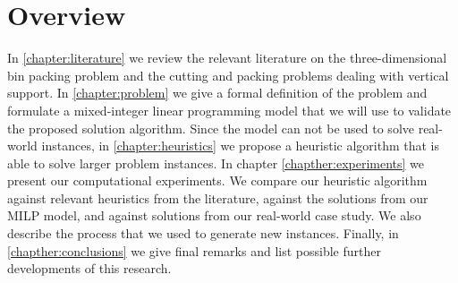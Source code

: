 \section{Overview}
\label{sec:intro:overview}%
In \cref{chapter:literature} we review the relevant literature on the three-dimensional bin packing problem and the cutting and packing problems dealing with vertical support.
In \cref{chapter:problem} we give a formal definition of the problem and formulate a mixed-integer linear programming model that we will use to validate the proposed solution algorithm.
Since the model can not be used to solve real-world instances, in \cref{chapter:heuristics} we propose a heuristic algorithm that is able to solve larger problem instances.
In chapter \cref{chapther:experiments} we present our computational experiments. We compare our heuristic algorithm against relevant heuristics from the literature, against the solutions from our MILP model, and against solutions from our real-world case study. We also describe the process that we used to generate new instances.
Finally, in \cref{chapther:conclusions} we give final remarks and list possible further developments of this research.